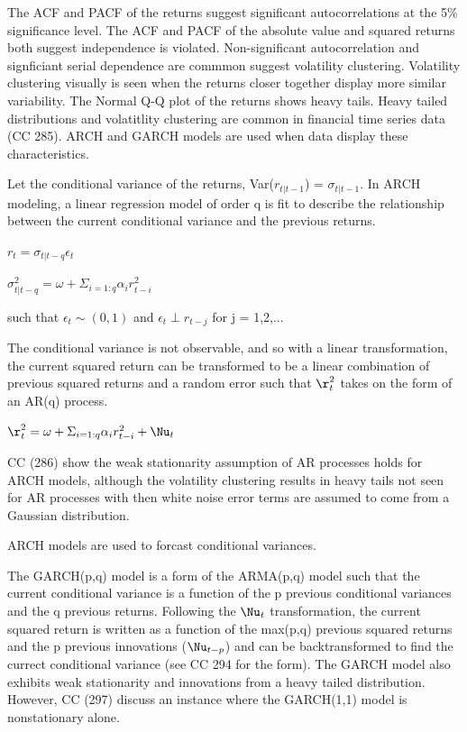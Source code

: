 \documentclass[11pt]{article}\usepackage[]{graphicx}\usepackage[]{color}
\begin{document}
The ACF and PACF of the returns suggest significant autocorrelations at the 5\% significance level. The ACF and PACF of the absolute value and squared returns both suggest independence is violated. Non-significant autocorrelation and signficiant serial dependence are commmon suggest volatility clustering. Volatility clustering visually is seen when the returns closer together display more similar variability. The Normal Q-Q plot of the returns shows heavy tails. Heavy tailed distributions and volatitlity clustering are common in financial time series data (CC 285). ARCH and GARCH models are used when data display these characteristics. 

Let the conditional variance of the returns, Var($r_{t|t-1}$) = $\sigma_{t|t-1}$. In ARCH modeling, a linear regression model of order q is fit to describe the relationship between the current conditional variance and the previous returns. 

$r_{t} = \sigma_{t|t-q}\epsilon_{t}$

$\sigma^{2}_{t|t-q} = \omega + \Sigma_{i=1:q} \alpha_{i}r^{2}_{t-i}$

such that $\epsilon_{t} \sim (0,1)$ and $\epsilon_{t} \perp r_{t-j}$ for j = 1,2,...

The conditional variance is not observable, and so with a linear transformation, the current squared return can be transformed to be a linear combination of previous squared returns and a random error such that $\r^{2}_{t}$ takes on the form of an AR(q) process.

$\r^{2}_{t} = \omega + \Sigma_{i=1:q} \alpha_{i}r^{2}_{t-i} + \Nu_{t}$

CC (286) show the weak stationarity assumption of AR processes holds for ARCH models, although the volatility clustering results in heavy tails not seen for AR processes with then white noise error terms are assumed to come from a Gaussian distribution. 

ARCH models are used to forcast conditional variances. 


The GARCH(p,q) model is a form of the ARMA(p,q) model such that the current conditional variance is a function of the p previous conditional variances and the q previous returns. Following the $\Nu_{t}$ transformation, the current squared return is written as a function of the max(p,q) previous squared returns and the p previous innovations ($\Nu_{t-p}$) and can be backtransformed to find the currect conditional variance (see CC 294 for the form). The GARCH model also exhibits weak stationarity and innovations from a heavy tailed distribution. However, CC (297) discuss an instance where the GARCH(1,1) model is nonstationary alone.
\end{document}
